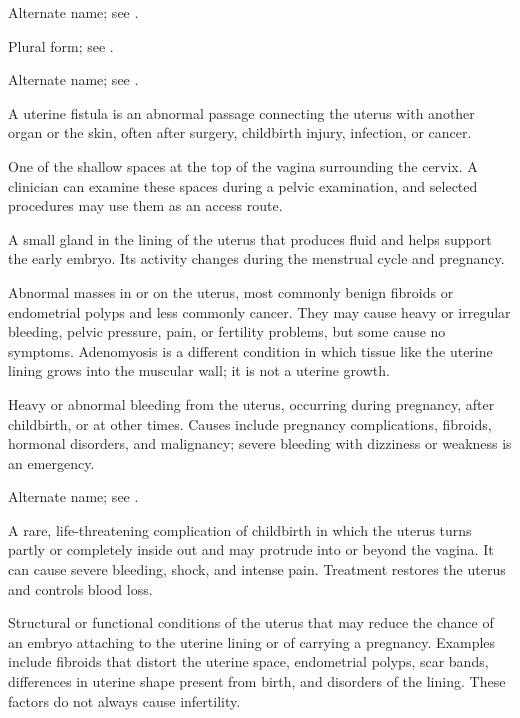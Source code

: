  Alternate name; see .

 Plural form; see .

 Alternate name; see .

 A uterine fistula is an abnormal passage connecting the uterus with another organ or the skin, often after surgery, childbirth injury, infection, or cancer.

 One of the shallow spaces at the top of the vagina surrounding the cervix. A clinician can examine these spaces during a pelvic examination, and selected procedures may use them as an access route.

 A small gland in the lining of the uterus that produces fluid and helps support the early embryo. Its activity changes during the menstrual cycle and pregnancy.

 Abnormal masses in or on the uterus, most commonly benign fibroids or endometrial polyps and less commonly cancer. They may cause heavy or irregular bleeding, pelvic pressure, pain, or fertility problems, but some cause no symptoms. Adenomyosis is a different condition in which tissue like the uterine lining grows into the muscular wall; it is not a uterine growth.

 Heavy or abnormal bleeding from the uterus, occurring during pregnancy, after childbirth, or at other
times. Causes include pregnancy complications, fibroids, hormonal disorders, and malignancy;
severe bleeding with dizziness or weakness is an emergency.

 Alternate name; see .

 A rare, life-threatening complication of childbirth in which the uterus turns partly or completely inside out and may protrude into or beyond the vagina. It can cause severe bleeding, shock, and intense pain. Treatment restores the uterus and controls blood loss.

 Structural or functional conditions of the uterus that may
reduce the chance of an embryo attaching to the uterine lining or of carrying a pregnancy. Examples
include fibroids that distort the uterine space, endometrial polyps, scar bands, differences in
uterine shape present from birth, and disorders of the lining. These factors do not always cause
infertility.


